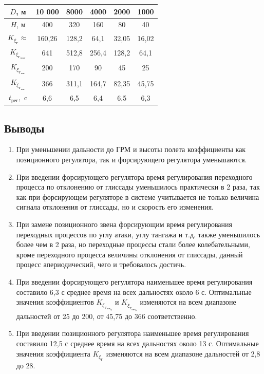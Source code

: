 \begin{table}[H]
    \centering
    \begin{tabular}{c|c|c|c|c|c}
    \hline
        $D$, м & 10 000 & 8000 & 4000 & 2000 & 1000  \\ \hline
        $H$, м & 400 & 320 & 160 & 80 & 40  \\ \hline
        $K_{\xi_\text{Г}} \approx$ &160,26 & 128,2 & 64,1 & 32,05 & 16,02  \\ \hline  
        $K_{\xi_\text{Г}_{max}}$ & 641 & 512,8 & 256,4 & 128,2 & 64,1  \\ \hline
        $K_{\xi_\text{Г}_\text{опт}}$ &200 & 170 & 90 & 45 & 25  \\ \hline
        $K_{\dot{\xi}_\text{Г}_\text{опт}}$ & 366 & 311,1 & 164,7 & 82,35 & 45,75  \\ \hline
        $t_\text{рег},$ c & 6,6 & 6,5 & 6,4 & 6,5 & 6,3  \\ \hline
    \end{tabular}
\end{table}

\begin{center}
    \item \section*{Выводы}
\end{center}
\begin{enumerate}
    \item При уменьшении дальности до ГРМ и высоты полета коэффициенты как позиционного регулятора, так и форсирующего регулятора уменьшаются.
    \item При введении форсирующего регулятора время регулирования переходного процесса по отклонению от глиссады уменьшилось практически в 2 раза, так как при форсирующем регуляторе в системе учитывается не только величина сигнала отклонения от глиссады, но и скорость его изменения.
    \item При замене позиционного звена форсирующим время регулирования переходных процессов по углу атаки, углу тангажа и т.д. также уменьшилось более чем в 2 раза, но переходные процессы стали более колебательными, кроме переходного процесса величины отклонения от глиссады, данный процесс апериодический, чего и требовалось достичь.
    \item При введении форсирующего регулятора наименьшее время регулирования составило 6,3 с среднее время на всех дальностях около 6 с. Оптимальные значения коэффициентов $K_{\xi_\text{Г}_\text{опт}_\text{ф}}$ и $K_{\dot{\xi}_\text{Г}_\text{опт}_\text{ф}}$ изменяются на всем диапазоне дальностей от 25 до 200, от 45,75 до 366 соответственно.
    \item При введении позиционного регулятора наименьшее время регулирования составило 12,5 с среднее время на всех дальностях около 13 с. Оптимальные значения коэффициента  $K_{\dot{\xi}_\text{Г}}$ изменяются на всем диапазоне дальностей от 2,8 до 28.
\end{enumerate}


